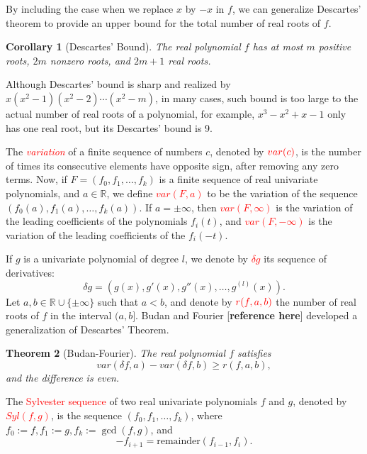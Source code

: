 \documentclass[12pt]{amsart}
\newtheorem{theorem}{Theorem}
\newtheorem{corollary}[theorem]{Corollary}
\theoremstyle{definition}
\newcommand{\RR}{\mathbb{R}}
\begin{document}
By including the case when we replace $x$ by $-x$ in $f$, we can generalize Descartes' theorem to provide an upper bound for the total number of real roots of $f$.

\begin{corollary}[Descartes' Bound]The real polynomial $f$ has at most $m$ positive roots, $2m$ nonzero roots, and $2m + 1$ real roots.\end{corollary}

Although Descartes' bound is sharp and realized by $x(x^{2}-1)(x^{2}-2)\cdots(x^{2}-m)$, in many cases, such bound is too large to the actual number of real roots of a polynomial, for example, $x^{3} - x^{2} + x - 1$ only has one real root, but its Descartes' bound is 9. 

The \textit{\textcolor{red}{variation}} of a finite sequence of numbers $c$, denoted by $\textcolor{red}{var(c)}$, is the number of times its consecutive elements have opposite sign, after removing any zero terms. Now, if $F=(f_{0},f_{1},\dots,f_{k})$ is a finite sequence of real univariate polynomials, and $a\in \RR$, we define \textcolor{red}{$var(F,a)$} to be the variation of the sequence $(f_{0}(a),f_{1}(a),\dots,f_{k}(a))$. If $a=\pm\infty$, then \textcolor{red}{$var(F,\infty)$} is the variation of the leading coefficients of the polynomials $f_{i}(t)$, and \textcolor{red}{$var(F,-\infty)$} is the variation of the leading coefficients of the $f_{i}(-t)$.


If $g$ is a univariate polynomial of degree $l$, we denote by \textcolor{red}{$\delta g$} its sequence of derivatives: $$\delta g = \left(g(x),g'(x),g''(x),\dots,g^{(l)}(x)\right).$$ Let $a,b\in \RR\cup\{\pm \infty\}$ such that $a<b$, and denote by $\textcolor{red}{r(f,a,b)}$ the number of real roots of $f$ in the interval $(a,b]$. Budan and Fourier [\textbf{reference here}] developed a generalization of Descartes' Theorem.

\begin{theorem}[Budan-Fourier] The real polynomial $f$ satisfies $$var(\delta f,a) - var(\delta f,b) \geq r(f,a,b),$$ and the difference is even.\end{theorem}

The \textcolor{red}{Sylvester sequence} of two real univariate polynomials $f$ and $g$, denoted by \textcolor{red}{$Syl(f,g)$}, is the sequence $\left(f_{0},f_{1},\dots,f_{k}\right)$, where $f_{0} := f, f_{1} := g, f_{k} := \gcd(f,g)$, and $$-f_{i+1} = \text{remainder}(f_{i-1},f_{i}).$$
\end{document}
